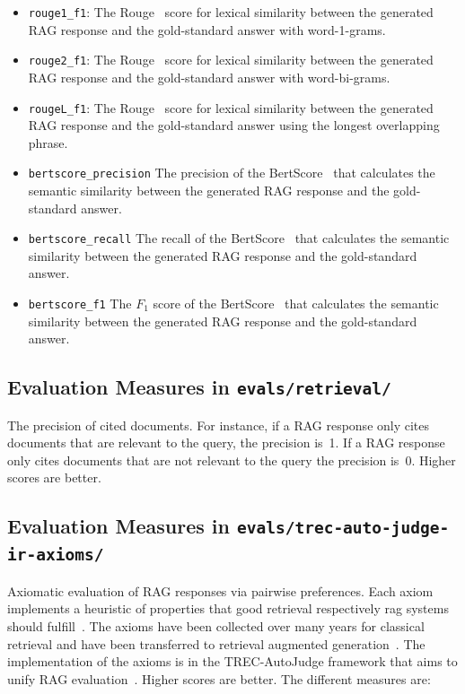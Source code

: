 \documentclass[]{ceurart}
\begin{document}
\begin{itemize}
\item
\texttt{rouge1\_f1}: The Rouge~\cite{lin:2004} score for lexical similarity between the generated RAG response and the gold-standard answer with word-1-grams.

\item
\texttt{rouge2\_f1}: The Rouge~\cite{lin:2004} score for lexical similarity between the generated RAG response and the gold-standard answer with word-bi-grams.

\item
\texttt{rougeL\_f1}: The Rouge~\cite{lin:2004} score for lexical similarity between the generated RAG response and the gold-standard answer using the longest overlapping phrase.

\item
\texttt{bertscore\_precision} The precision of the BertScore~\cite{zhang:2020} that calculates the semantic similarity between the generated RAG response and the gold-standard answer.

\item
\texttt{bertscore\_recall} The recall of the BertScore~\cite{zhang:2020} that calculates the semantic similarity between the generated RAG response and the gold-standard answer.

\item
\texttt{bertscore\_f1} The $F_{1}$ score of the BertScore~\cite{zhang:2020} that calculates the semantic similarity between the generated RAG response and the gold-standard answer.

\end{itemize}

\subsection{Evaluation Measures in \texttt{evals/retrieval/}}

The precision of cited documents. For instance, if a RAG response only cites documents that are relevant to the query, the precision is~1. If a RAG response only cites documents that are not relevant to the query the precision is~0. Higher scores are better.

\subsection{Evaluation Measures in \texttt{evals/trec-auto-judge-ir-axioms/}}

Axiomatic evaluation of RAG responses via pairwise preferences. Each axiom implements a heuristic of properties that good retrieval respectively rag systems should fulfill~\cite{merker:2025}. The axioms have been collected over many years for classical retrieval and have been transferred to retrieval augmented generation~\cite{merker:2025}. The implementation of the axioms is in the TREC-AutoJudge framework that aims to unify RAG evaluation~\cite{farzi:2026}. Higher scores are better. The different measures are:
\end{document}
